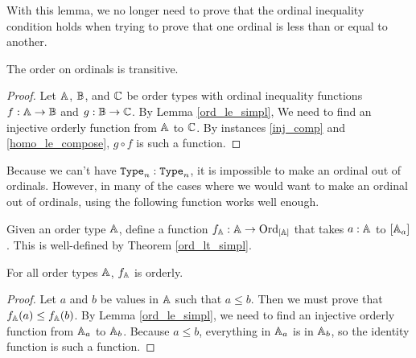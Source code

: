 \documentclass[../../math.tex]{subfiles}
\begin{document}
With this lemma, we no longer need to prove that the ordinal inequality
condition holds when trying to prove that one ordinal is less than or equal to
another.

\begin{instance}
    The order on ordinals is transitive.
\end{instance}
\begin{proof}
    Let $\mathbb{A}$, $\mathbb{B}$, and $\mathbb{C}$ be order types with ordinal inequality functions $f
    : \mathbb{A} \to \mathbb{B}$ and $g : \mathbb{B} \to \mathbb{C}$.  By Lemma \ref{ord_le_simpl}, We need to
    find an injective orderly function from $\mathbb{A}$ to $\mathbb{C}$.  By instances
    \ref{inj_comp} and \ref{homo_le_compose}, $g \circ f$ is such a function.
\end{proof}

Because we can't have $\Type_n : \Type_n$, it is impossible to make an ordinal
out of ordinals.  However, in many of the cases where we would want to make an
ordinal out of ordinals, using the following function works well enough.

\begin{definition} \label{ord_type_init_ord}
    Given an order type $\mathbb{A}$, define a function $f_{\mathbb{A}} : \mathbb{A} \to \operatorname{Ord}_{[\mathbb{A}]}$ that
    takes $a : \mathbb{A}$ to $[\mathbb{A}_a]$.  This is well-defined by Theorem
    \ref{ord_lt_simpl}.
\end{definition}

\begin{theorem}
    For all order types $\mathbb{A}$, $f_{\mathbb{A}}$ is orderly.
\end{theorem}
\begin{proof}
    Let $a$ and $b$ be values in $\mathbb{A}$ such that $a \leq b$.  Then we must prove
    that $f_{\mathbb{A}}(a) \leq f_{\mathbb{A}}(b)$.  By Lemma \ref{ord_le_simpl}, we need to find
    an injective orderly function from $\mathbb{A}_a$ to $\mathbb{A}_b$.  Because $a \leq b$,
    everything in $\mathbb{A}_a$ is in $\mathbb{A}_b$, so the identity function is such a
    function.
\end{proof}
\end{document}
